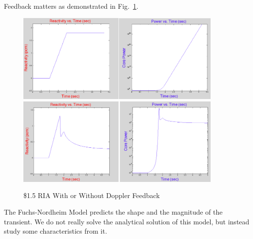 \documentclass{school-22.211-notes}
\date{April 30, 2012}
\begin{document}
\maketitle

Feedback matters as demonstrated in Fig.~\ref{feedback}. 
\begin{figure}[ht]
\centering
\includegraphics[width=4in]{images/pke/feedback1.png}
\\
\includegraphics[width=4in]{images/pke/feedback2.png}
\caption{\$1.5 RIA With or Without Doppler Feedback}\label{feedback}
\end{figure}

\clearpage
{}
The Fuchs-Nordheim Model predicts the shape and the magnitude of the transient. We do not really solve the analytical solution of this model, but instead study some characteristics from it. 
\end{document}
